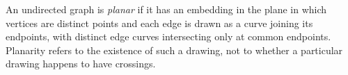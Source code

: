 
An undirected graph is \emph{planar} if it has an embedding in the plane in which vertices are distinct points and each edge is drawn as a curve joining its endpoints, with distinct edge curves intersecting only at common endpoints. Planarity refers to the existence of such a drawing, not to whether a particular drawing happens to have crossings.
